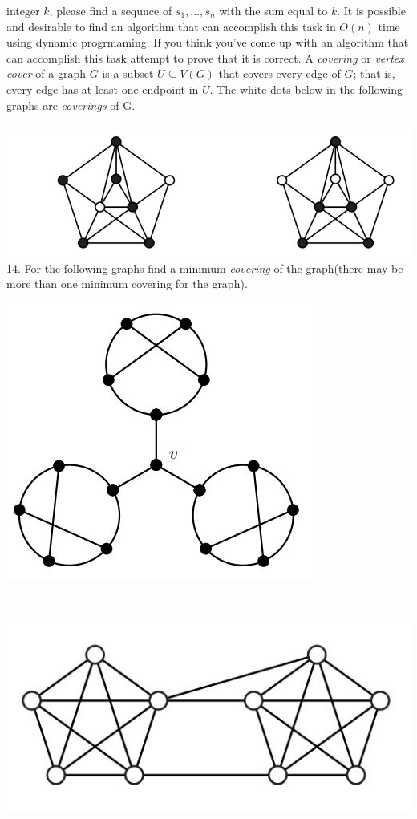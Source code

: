 \documentclass[12pt]{article}
\begin{document}
integer $k$, please find a sequnce of $s_1,\dots,s_n$ with the sum equal
to $k$. It is possible and desirable to find an algorithm that can accomplish this
task in $O(n)$ time using dynamic progrmaming. If you think you've come up with an
algorithm that can accomplish this task attempt to prove that it is correct.
\newpage
\noindent A \textit{covering} or \textit{vertex cover} of a graph $G$ is a subset $U ⊆ V(G)$ that covers every
edge of $G$; that is, every edge has at least one endpoint in $U$. The white dots below
in the following graphs are \textit{coverings} of G.\\\\
\includegraphics[width=\textwidth]{covering.jpg}\\
14. For the following graphs find a minimum \textit{covering} of the graph(there may
be more than one minimum covering for the graph).\\
\centerline{\includegraphics[scale=0.5]{graph1.jpg}}\\
\centerline{\includegraphics[scale=0.5]{graph2.jpg}}\\
\newpage
\end{document}
